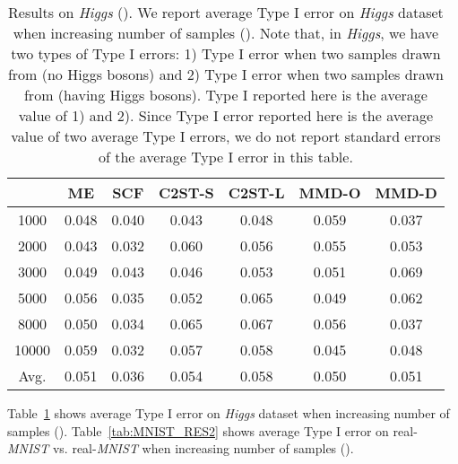 \documentclass{article}
\begin{document}
\begin{table}[t]
\centering
  \small
  \caption{Results on \emph{Higgs} (). We report average Type I error on \emph{Higgs} dataset when increasing number of samples (). Note that, in \emph{Higgs}, we have two types of Type I errors: 1) Type I error when two samples drawn from  (no Higgs bosons) and 2) Type I error when two samples drawn from  (having Higgs bosons). Type I reported here is the average value of 1) and 2). Since Type I error reported here is the average value of two average Type I errors, we do not report standard errors of the average Type I error in this table.} \label{tab:Higgs_RES2}
\begin{tabular}{c|cccccc}
\toprule
 & ME & SCF & C2ST-S & C2ST-L & MMD-O & MMD-D \\
\midrule
1000 & 0.048 & 0.040 & 0.043 & 0.048 & 0.059 & 0.037\\
2000 &  0.043 & 0.032 & 0.060 & 0.056 & 0.055 & 0.053 \\
3000 & 0.049 & 0.043 & 0.046 & 0.053 & 0.051 & 0.069 \\
5000 & 0.056 & 0.035 & 0.052 & 0.065 & 0.049 & 0.062 \\
8000 & 0.050 & 0.034 & 0.065 & 0.067 & 0.056 & 0.037  \\
10000 & 0.059 & 0.032 & 0.057 & 0.058 & 0.045 & 0.048 \\
\midrule
Avg. &  0.051 & 0.036 & 0.054 & 0.058 & 0.050 & 0.051  \\
\bottomrule
\end{tabular}

\end{table}

Table~\ref{tab:Higgs_RES2} shows average Type I error on \emph{Higgs} dataset when increasing number of samples (). Table~\ref{tab:MNIST_RES2} shows  average Type I error on real-\emph{MNIST} vs. real-\emph{MNIST} when increasing number of samples ().
\end{document}
